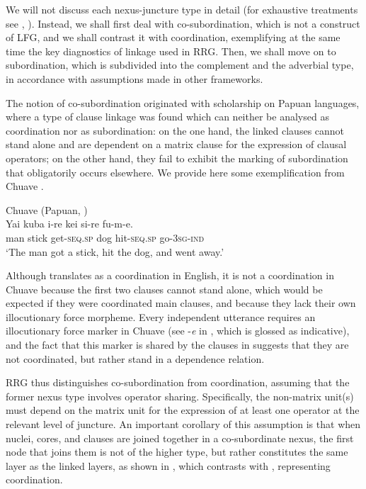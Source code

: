 \documentclass[output=paper,hidelinks]{langscibook}
\begin{document}
  We will not discuss each nexus-juncture type in detail (for exhaustive treatments see \citealt[441-492]{VanValin1997}, \citealt{Ohori2022}). Instead, we shall first deal with co-subordination, which is not a construct of LFG, and we shall contrast it with coordination, exemplifying at the same time the key diagnostics of linkage used in RRG. Then, we shall move on to subordination, which is subdivided into the complement and the adverbial type, in accordance with assumptions made in other frameworks.

  The notion of co-subordination originated with scholarship on Papuan languages, where a type of clause linkage was found which can neither be analysed as coordination nor as subordination: on the one hand, the linked clauses cannot stand alone and are dependent on a matrix clause for the expression of clausal operators; on the other hand, they fail to exhibit the marking of subordination that obligatorily occurs elsewhere. We provide here some exemplification from Chuave \citep{Thurmann1975}.


 \largerpage
\ea%
   \label{ex:RRG:34}  Chuave (Papuan, \citealt[448]{VanValin1997})\\
   \gll Yai  kuba  i-re  kei  si-re  fu-m-e. \\
  man  stick  get-\textsc{seq.sp}  dog  hit-\textsc{seq.sp}  go-\textsc{3sg-ind}\\
   \glt `The man got a stick, hit the dog, and went away.'
   \z

Although  translates as a coordination in English, it is not a coordination in Chuave because the first two clauses cannot stand alone, which would be expected if they were coordinated main clauses, and because they lack their own illocutionary force morpheme. Every independent utterance requires an illocutionary force marker in Chuave (see {}-\textit{e} in , which is glossed as indicative), and the fact that this marker is shared by the clauses in  suggests that they are not coordinated, but rather stand in a dependence relation.

  RRG thus distinguishes co-subordination from coordination, assuming that the former nexus type involves operator sharing. Specifically, the non-matrix unit(s) must depend on the matrix unit for the expression of at least one operator at the relevant level of juncture. An important corollary of this assumption is that when nuclei, cores, and clauses are joined together in a co-subordinate nexus, the first node that joins them is not of the higher type, but rather constitutes the same layer as the linked layers, as shown in , which contrasts with , representing coordination.
\end{document}
